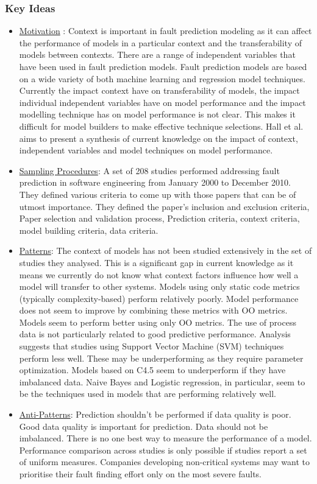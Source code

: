 \documentclass[conference]{IEEEtran}
\begin{document}
\subsubsection{\textbf{Key Ideas}}
\begin{itemize}
    \item \underline{Motivation} : Context is important in fault prediction modeling as it can affect the performance of models in a particular context and the transferability of models between contexts. There are a range of independent variables that have been used in fault prediction models. Fault prediction models are based on a wide variety of both machine learning and regression model techniques. Currently the impact context have on transferability of models, the impact individual independent variables have on model performance and the impact modelling technique has on model performance is not clear. This makes it difficult for model builders to make effective technique selections. Hall et al. aims to present a synthesis of current knowledge on the impact of context, independent variables and model techniques on model performance. 
    \item \underline{Sampling Procedures}: A set of 208 studies performed addressing fault prediction in software engineering from January 2000 to December 2010. They defined various criteria to come up with those papers that can be of utmost importance. They defined the paper's inclusion and exclusion criteria, Paper selection and validation process, Prediction criteria, context criteria, model building criteria, data criteria.
    \item \underline{Patterns}: The context of models has not been studied extensively in the set of studies they analysed. This is a significant gap in current knowledge as it means we currently do not know what context factors influence how well a model will transfer to other systems. Models using only static code metrics (typically complexity-based) perform relatively poorly. Model performance does not seem to improve by combining these metrics with OO metrics. Models seem to perform better using only OO metrics. The use of process data is not particularly related to good predictive performance. Analysis suggests that studies using Support Vector Machine (SVM) techniques perform less well. These may be underperforming as they require parameter optimization. Models based on C4.5 seem to underperform if they have imbalanced data. Naive Bayes and Logistic regression, in particular, seem to be the techniques used in models that are performing relatively well. 
    \item \underline{Anti-Patterns}: Prediction shouldn't be performed if data quality is poor. Good data quality is important for prediction. Data should not be imbalanced. There is no one best way to measure the performance of a model. Performance comparison across studies is only possible if studies report a set of uniform measures. Companies developing non-critical systems may want to prioritise their fault finding effort only on the most severe faults.
\end{itemize}
\end{document}
